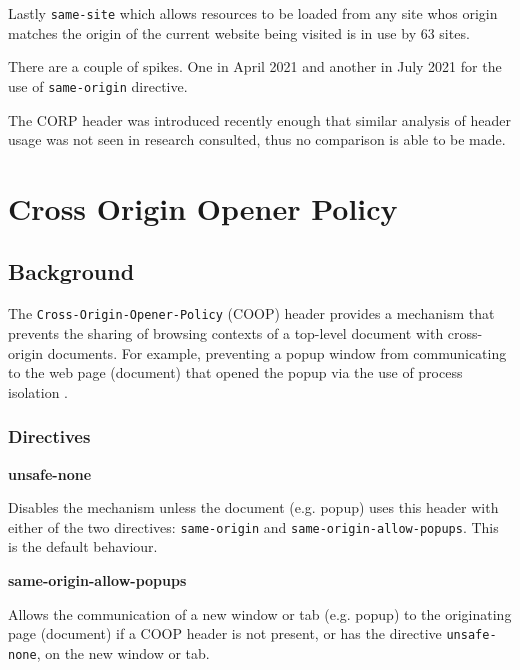 \documentclass{mscreport}
\begin{document}
\vspace{0.3cm} \noindent
Lastly \texttt{same-site} which allows resources to be loaded from any site whos origin matches the origin of the current website being visited is in use by 63 sites.

\vspace{0.3cm} \noindent
There are a couple of spikes. One in April 2021 and another in July 2021 for the use of \texttt{same-origin} directive.

\vspace{0.3cm} \noindent
The CORP header was introduced recently enough that similar analysis of header usage was not seen in research consulted, thus no comparison is able to be made.

\clearpage
\newpage


\section{Cross Origin Opener Policy}
\label{section:coop}

\subsection{Background}

The \texttt{Cross-Origin-Opener-Policy} (COOP) header provides a mechanism that prevents the sharing of browsing contexts of a top-level document with cross-origin documents. For example, preventing a popup window from communicating to the web page (document) that opened the popup via the use of process isolation \cite{Apple_undated-gj}.

\subsubsection{Directives}
\textbf{unsafe-none}

\vspace{0.3cm} \noindent
Disables the mechanism unless the document (e.g. popup) uses this header with either of the two directives: \texttt{same-origin} and \texttt{same-origin-allow-popups}. This is the default behaviour.

\vspace{0.7cm} \noindent
\textbf{same-origin-allow-popups}

\vspace{0.3cm} \noindent
Allows the communication of a new window or tab (e.g. popup) to the originating page (document) if a COOP header is not present, or has the directive \texttt{unsafe-none}, on the new window or tab.
\end{document}
